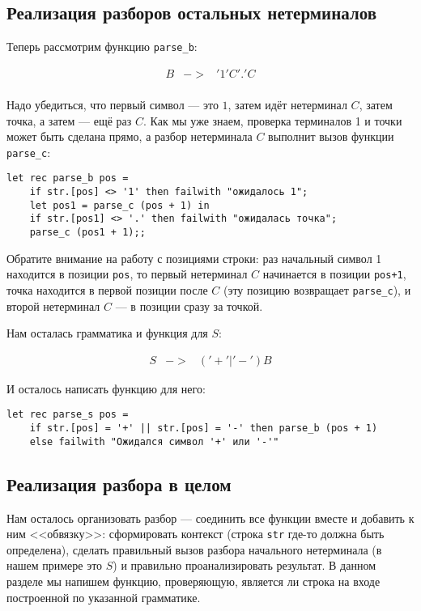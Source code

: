 \documentclass[12pt]{article}
\begin{document}
\subsection{Реализация разборов остальных нетерминалов}

Теперь рассмотрим функцию \verb!parse_b!: 
\begin{bnf}\begin{eqnarray*}
B &->& '1' C '.' C\\
\end{eqnarray*}\end{bnf}

Надо убедиться, что первый символ --- это $1$, затем идёт нетерминал $C$, затем точка, 
а затем --- ещё раз $C$. Как мы уже знаем, проверка терминалов 1 и точки может быть
сделана прямо, а разбор нетерминала $C$ выполнит вызов функции \verb!parse_c!:

\begin{verbatim}
let rec parse_b pos =
    if str.[pos] <> '1' then failwith "ожидалось 1";
    let pos1 = parse_c (pos + 1) in
    if str.[pos1] <> '.' then failwith "ожидалась точка";
    parse_c (pos1 + 1);;
\end{verbatim}

Обратите внимание на работу с позициями строки: раз начальный символ 1 находится
в позиции \verb!pos!, то первый нетерминал $C$ начинается в позиции \verb!pos+1!,
точка находится в первой позиции после $C$ (эту позицию возвращает \verb!parse_c!),
и второй нетерминал $C$ --- в позиции сразу за точкой.

Нам осталась грамматика и функция для $S$:
\begin{bnf}\begin{eqnarray*}
S &->& ('+'|'-') B
\end{eqnarray*}\end{bnf}%
\noindent И осталось написать функцию для него:
\begin{verbatim}
let rec parse_s pos =
    if str.[pos] = '+' || str.[pos] = '-' then parse_b (pos + 1)
    else failwith "Ожидался символ '+' или '-'"
\end{verbatim}

\subsection{Реализация разбора в целом}

Нам осталось организовать разбор --- соединить все функции вместе и добавить к ним
<<обвязку>>: сформировать контекст (строка \verb!str! где-то должна быть определена),
сделать правильный вызов разбора начального нетерминала (в нашем примере это $S$) и
правильно проанализировать результат. В данном разделе мы напишем функцию,
проверяющую, является ли строка на входе построенной по указанной грамматике.
\end{document}
